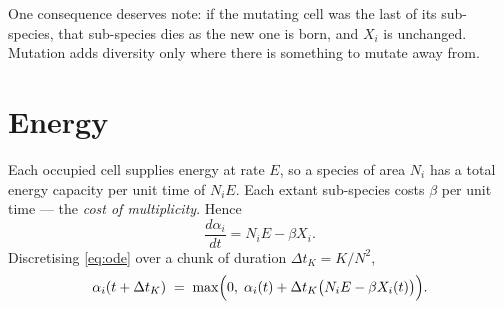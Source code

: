 \documentclass[11pt,a4paper]{article}
\newcommand{\dt}{\Delta t}
\begin{document}
One consequence deserves note: if the mutating cell was the last of its sub-species, that
sub-species dies as the new one is born, and $X_i$ is unchanged. Mutation adds diversity
only where there is something to mutate away from.

\section{Energy}
\label{sec:energy}

Each occupied cell supplies energy at rate $E$, so a species of area $N_i$ has a total
energy capacity per unit time of $N_i E$. Each extant sub-species costs $\beta$ per unit
time --- the \emph{cost of multiplicity}. Hence
\begin{equation}
  \frac{d\alpha_i}{dt} = N_i E - \beta X_i .
  \label{eq:ode}
\end{equation}
Discretising \eqref{eq:ode} over a chunk of duration $\dt_K = K/N^2$,
\begin{equation}
  \alpha_i(t + \dt_K) \;=\; \max\Bigl(0,\;
    \alpha_i(t) + \dt_K \bigl( N_i E - \beta X_i(t) \bigr)\Bigr).
  \label{eq:euler}
\end{equation}
\end{document}
